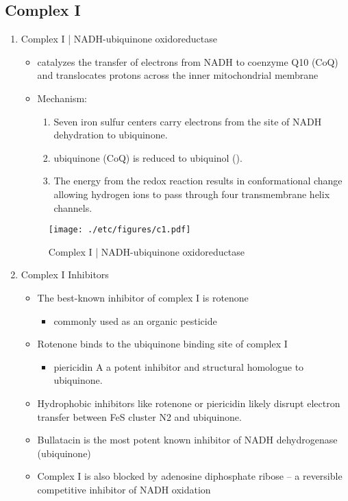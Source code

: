 \documentclass{scrartcl}
\begin{document}
\subsection{Complex I}
\label{sec:orga6fc44b}
\begin{enumerate}
\item Complex I | NADH-ubiquinone oxidoreductase
\label{sec:org8911b93}
\begin{itemize}
\item catalyzes the transfer of electrons from NADH to coenzyme Q10
(CoQ) and translocates protons across the inner mitochondrial
membrane
\end{itemize}

{\small{}}

\begin{itemize}
\item Mechanism: 
\begin{enumerate}
\item Seven iron sulfur centers carry electrons from the site of NADH
dehydration to ubiquinone.

\item ubiquinone (CoQ) is reduced to ubiquinol ().

\item The energy from the redox reaction results in conformational
change allowing hydrogen ions to pass through four transmembrane
helix channels.
\end{enumerate}
\end{itemize}

\begin{figure}[htbp]
\centering
\texttt{[image: ./etc/figures/c1.pdf]}
\caption[c1]{\label{fig:orgb0c7abb}
Complex I | NADH-ubiquinone oxidoreductase}
\end{figure}

\item Complex I Inhibitors
\label{sec:org440b884}
\begin{itemize}
\item The best-known inhibitor of complex I is rotenone
\begin{itemize}
\item commonly used as an organic pesticide
\end{itemize}
\item Rotenone binds to the ubiquinone binding site of complex I
\begin{itemize}
\item piericidin A a potent inhibitor and structural homologue to ubiquinone.
\end{itemize}
\item Hydrophobic inhibitors like rotenone or piericidin likely disrupt electron transfer between FeS cluster N2 and ubiquinone.
\item Bullatacin is the most potent known inhibitor of NADH dehydrogenase (ubiquinone)
\item Complex I is also blocked by adenosine diphosphate ribose – a reversible competitive inhibitor of NADH oxidation
\end{itemize}
\end{enumerate}
\end{document}
